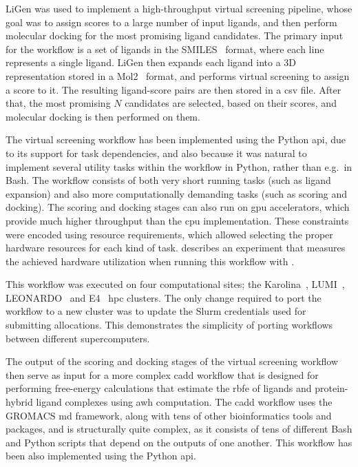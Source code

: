 LiGen was used to implement a high-throughput virtual screening pipeline, whose goal was to assign
scores to a large number of input ligands, and then perform molecular docking for the most
promising ligand candidates. The primary input for the workflow is a set of ligands in the
SMILES~\cite{smiles} format, where each line represents a single ligand. LiGen then
expands each ligand into a 3D representation stored in a Mol2~\cite{mol2} format, and
performs virtual screening to assign a score to it. The resulting ligand-score pairs are then
stored in a \gls{csv} file. After that, the most promising $N$
candidates are selected, based on their scores, and molecular docking is then performed on them.

The virtual screening workflow has been implemented using the \hyperqueue{} Python
\gls{api}, due to its support for task dependencies, and also because it was natural
to implement several utility tasks within the workflow in Python, rather than e.g.\ in Bash. The
workflow consists of both very short running tasks (such as ligand expansion) and also more
computationally demanding tasks (such as scoring and docking). The scoring and docking stages can
also run on \gls{gpu} accelerators, which provide much higher throughput than the
\gls{cpu} implementation. These constraints were encoded using
\hq{} resource requirements, which allowed selecting the proper hardware
resources for each kind of task.  describes an experiment that measures the
achieved hardware utilization when running this workflow with \hyperqueue{}.

This workflow was executed on four computational sites; the Karolina~\cite{karolina},
LUMI~\cite{lumi}, LEONARDO~\cite{leonardo} and E4~\cite{e4}
\gls{hpc} clusters. The only change required to port the workflow to a new cluster
was to update the Slurm credentials used for submitting allocations. This demonstrates the
simplicity of porting \hyperqueue{} workflows between different supercomputers.

The output of the scoring and docking stages of the virtual screening workflow then serve as input
for a more complex \gls{cadd} workflow that is designed for performing free-energy
calculations that estimate the \gls{rbfe} of ligands and protein-hybrid ligand
complexes using \gls{awh} computation. The \gls{cadd} workflow uses the
GROMACS \gls{md} framework, along with tens of other bioinformatics tools and
packages, and is structurally quite complex, as it consists of tens of different Bash and Python
scripts that depend on the outputs of one another. This workflow has been also implemented using
the \hyperqueue{} Python \gls{api}.

